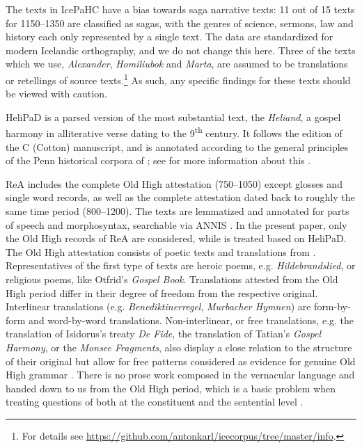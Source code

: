 \documentclass[output=paper,colorlinks,citecolor=brown,draft]{langscibook}
\begin{document}
The  texts in IcePaHC have a  bias towards saga narrative texts: 11 out of 15 texts for 1150--1350 are classified as sagas, with the genres of science, sermons, law and history each only represented by a single text. The  data are standardized for modern Icelandic orthography, and we do not change this here. Three of the texts which we use, \textit{Alexander}, \textit{Homiliubok} and \textit{Marta}, are assumed to be translations or retellings of  source texts.\footnote{For details see \href{https://github.com/antonkarl/icecorpus/tree/master/info}{https://github.com/antonkarl/icecorpus/tree/master/info}.}  As such, any specific findings for these texts should be viewed with caution.
 
HeliPaD is a parsed version of the most substantial  text, the \textit{Heliand}, a gospel harmony in alliterative verse dating to the 9\textsuperscript{th} century. It follows the \citet{Sievers1878} edition of the C (Cotton) manuscript, and is annotated according to the general principles of the Penn historical corpora of ; see \citet{Walkden16} for more information about this .\largerpage

ReA includes the complete Old High  attestation (750–1050) except glosses and single word records, as well as the complete  attestation dated back to roughly the same time period (800–1200). The texts are lemmatized and annotated for parts of speech and morphosyntax, searchable via ANNIS \citep{KrauseZelde16}. In the present paper, only the Old High  records of ReA are considered, while  is treated based on HeliPaD. The Old High  attestation consists of poetic texts and translations from . Representatives of the first type of texts are heroic poems, e.g. \textit{Hildebrandslied}, or religious poems, like Otfrid's \textit{Gospel Book}. Translations attested from the Old High  period differ in their degree of freedom from the respective  original. Interlinear translations (e.g. \textit{Benediktinerregel}, \textit{Murbacher Hymnen}) are form-by-form and word-by-word translations. Non-interlinear, or free translations, e.g. the translation of Isidorus’s treaty \textit{De Fide}, the translation of Tatian’s \textit{Gospel Harmony}, or the \textit{Monsee Fragments}, also display a close relation to the structure of their original but allow for free patterns considered as evidence for genuine Old High  grammar \citep{DittmerDittmer98}. There is no prose work composed in the vernacular language and handed down to us from the Old High  period, which is a basic problem when treating questions of  both at the constituent and the sentential level \citep{Fleischer06}.
\end{document}
